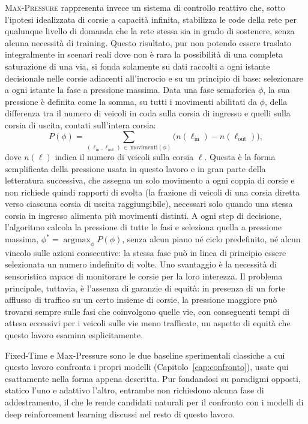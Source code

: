 \textsc{Max-Pressure} \citep{varaiya2013maxpressure} rappresenta invece
un sistema di controllo reattivo che, sotto l'ipotesi idealizzata di
corsie a capacità infinita, stabilizza le code della rete per qualunque
livello di domanda che la rete stessa sia in grado di sostenere, senza
alcuna necessità di training. Questo risultato, pur non potendo essere
traslato integralmente in scenari reali dove non è rara la possibilità di
una completa saturazione di una via, si fonda solamente su dati raccolti
a ogni istante decisionale nelle corsie adiacenti all'incrocio e su un
principio di base: selezionare a ogni istante la fase a pressione
massima. Data una fase semaforica $\phi$, la sua pressione è definita
come la somma, su tutti i movimenti abilitati da $\phi$, della differenza
tra il numero di veicoli in coda sulla corsia di ingresso e quelli sulla
corsia di uscita, contati sull'intera corsia:
\begin{equation}
  P(\phi) = \sum_{(\ell_{\mathrm{in}}, \ell_{\mathrm{out}}) \,\in\, \mathrm{movimenti}(\phi)} \big(n(\ell_{\mathrm{in}}) - n(\ell_{\mathrm{out}})\big),
  \label{eq:maxpressure-phase}
\end{equation}
dove $n(\ell)$ indica il numero di veicoli sulla corsia $\ell$. Questa è
la forma semplificata della pressione usata in questo lavoro e in gran
parte della letteratura successiva, che assegna un solo movimento a ogni
coppia di corsie e non richiede quindi rapporti di svolta (la frazione di
veicoli di una corsia diretta verso ciascuna corsia di uscita raggiungibile),
necessari solo quando una stessa corsia in ingresso alimenta più
movimenti distinti. A ogni step di decisione, l'algoritmo calcola la
pressione di tutte le fasi e seleziona quella a pressione massima, $\phi^*
  = \operatorname*{argmax}_\phi P(\phi)$, senza alcun piano né ciclo
predefinito, né alcun vincolo sulle azioni consecutive: la stessa fase
può in linea di principio essere selezionata un numero indefinito di
volte. Uno svantaggio è la necessità di sensoristica capace di monitorare
le corsie per la loro interezza. Il problema principale, tuttavia, è
l'assenza di garanzie di equità: in presenza di un forte afflusso di
traffico su un certo insieme di corsie, la pressione maggiore può
trovarsi sempre sulle fasi che coinvolgono quelle vie, con conseguenti
tempi di attesa eccessivi per i veicoli sulle vie meno trafficate, un
aspetto di equità che questo lavoro esamina esplicitamente.

Fixed-Time e Max-Pressure sono le due baseline sperimentali
classiche a cui questo lavoro confronta i propri modelli
(Capitolo~\ref{cap:confronto}), usate qui esattamente nella forma appena
descritta. Pur fondandosi su paradigmi opposti, statico l'uno e adattivo
l'altro, entrambe non richiedono alcuna fase di addestramento, il che le
rende candidati naturali per il confronto con i modelli di deep
reinforcement learning discussi nel resto di questo lavoro.

